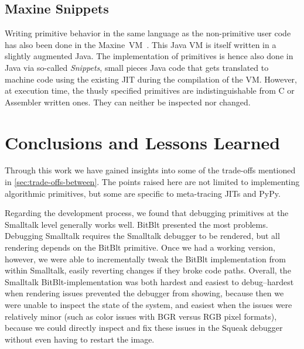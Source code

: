\documentclass[
10pt,          %
]{sigplanconf}
\begin{document}
\subsection{Maxine Snippets}

Writing primitive behavior in the same language as the non-primitive user code
has also been done in the
Maxine~\ac{VM}~\cite{Wimmer:2013:MAV:2400682.2400689}. This Java \ac{VM} is
itself written in a slightly augmented Java. The implementation of primitives
is hence also done in Java via so-called \emph{Snippets}, small pieces Java
code that gets translated to machine code using the existing \ac{JIT} during
the compilation of the \ac{VM}. However, at execution time, the thusly
specified primitives are indistinguishable from C or Assembler written ones.
They can neither be inspected nor changed.


\section{Conclusions and Lessons Learned}
\label{sec:conclusions}

Through this work we have gained insights into some of the trade-offs
mentioned in \autoref{sec:trade-offs-between}. The points raised here
are not limited to implementing algorithmic primitives, but some are
specific to meta-tracing \acp{JIT} and PyPy.

Regarding the development process, we found that debugging primitives
at the Smalltalk level generally works well. BitBlt presented the most
problems. Debugging Smalltalk requires the Smalltalk debugger to be
rendered, but all rendering depends on the BitBlt primitive. Once we
had a working version, however, we were able to incrementally tweak
the BitBlt implementation from within Smalltalk, easily reverting
changes if they broke code paths. Overall, the Smalltalk
BitBlt-implementation was both hardest and easiest to debug\---hardest
when rendering issues prevented the debugger from showing, because
then we were unable to inspect the state of the system, and easiest
when the issues were relatively minor (such as color issues with BGR
versus RGB pixel formats), because we could directly inspect and fix
these issues in the Squeak debugger without even having to restart the
image.
\end{document}

